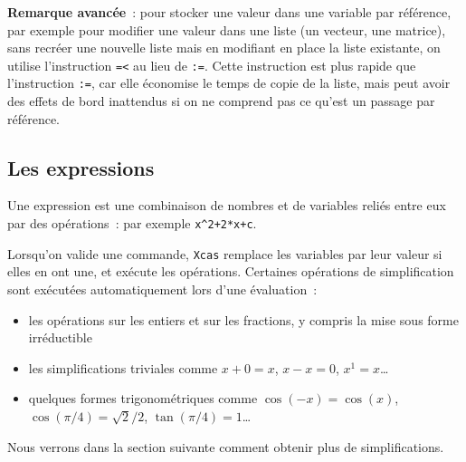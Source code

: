 \documentclass{article}
\begin{document}
\begin{giacjshere}
{\bf Remarque avanc\'ee}~: pour stocker une valeur dans une variable par r\'ef\'erence,
par exemple pour modifier une valeur dans une liste (un vecteur, une
matrice), sans recr\'eer une nouvelle liste mais en modifiant
en place la liste existante, on utilise l'instruction \verb|=<|
au lieu de \verb|:=|.
Cette instruction est plus rapide que l'instruction \verb|:=|, car
elle \'economise le temps de copie de la liste, mais peut avoir des
effets de bord inattendus si on ne comprend pas ce qu'est un passage
par r\'ef\'erence.
%
\subsection{Les expressions}
%
Une expression est une combinaison de nombres et de variables
reli\'es entre eux par des op\'erations~: par exemple 
\verb|x^2+2*x+c|. 

Lorsqu'on valide une commande, {\tt Xcas}
remplace les variables par leur valeur si elles en ont une,
et ex\'ecute les op\'erations. 
Certaines op\'erations de simplification sont ex\'ecut\'ees
automatiquement lors d'une \'evaluation~:
\begin{itemize}
\item les op\'erations sur les entiers et sur les 
fractions, y compris la mise
sous forme irr\'eductible
\item les simplifications triviales comme $x+0=x$,
$x-x=0$, $x^1=x$\ldots
\item quelques formes trigonom\'etriques comme 
$\cos(-x)=\cos(x)$, $\cos(\pi/4)=\sqrt{2}/2$, $\tan(\pi/4)=1$\ldots
\end{itemize}
Nous verrons dans la section suivante comment obtenir plus de simplifications.
%

\end{giacjshere}
\end{document}
